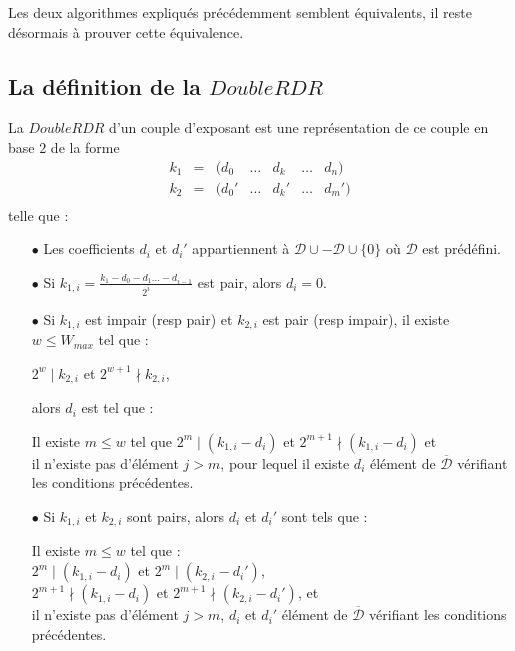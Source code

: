 \documentclass[12pt, a4paper]{memoir}
\newcommand{\dbarre}{\overline{\mathcal{D}}}
\begin{document}
  Les deux algorithmes expliqués précédemment semblent équivalents, il reste désormais à prouver cette équivalence.

  \subsection{La définition de la $DoubleRDR$}
  
  \begin{Definition}
   La $DoubleRDR$ d'un couple d'exposant est une représentation de ce couple en base $2$ de la forme
$$\begin{array}{cccccccccc}
  k_1 & = & (d_0 & \ldots & d_k  & \ldots & d_n) \\
  k_2 & = & (d_0' & \ldots & d_k' & \ldots & d_m') \\
 \end{array}$$
 telle que :
   \begin{itemize}
    \item [$\bullet$] Les coefficients $d_i$ et $d_i'$ appartiennent à $\mathcal{D} \cup -\mathcal{D} \cup \{0\}$
    où $\mathcal{D}$ est prédéfini.
    \item [$\bullet$] Si $k_{1,i} = \frac{k_1-d_0-d_1 \ldots -d_{i-1}}{2^i}$ est pair, alors $d_i = 0$.
    \item [$\bullet$] Si $k_{1,i}$ est impair (resp pair) et $k_{2,i}$ est pair (resp impair), il existe 
    $w \leq W_{max}$ tel que :
   \begin{center}
    $2^{w} \mid k_{2,i}$ et $2^{w+1} \nmid k_{2,i}$,
   \end{center}
   alors $d_i$ est tel que :
   \begin{center}
   Il existe $m \leq w$ tel que $2^{m} \mid (k_{1,i}-d_i)$ et $2^{m+1} \nmid (k_{1,i}-d_i)$ et \\
   il n'existe pas d'élément $j>m$, pour lequel il existe $d_i$ élément de $\dbarre$ vérifiant les conditions précédentes.
   \end{center}
   \item [$\bullet$] Si $k_{1,i}$ et $k_{2,i}$ sont pairs, alors $d_i$ et $d_i'$ sont tels que :
   \begin{center}
   Il existe $m \leq w$ tel que : \\
   $2^{m} \mid (k_{1,i}-d_i)$ et $2^{m} \mid (k_{2,i}-d_i')$, \\
   $2^{m+1} \nmid (k_{1,i}-d_i)$ et $2^{m+1} \nmid (k_{2,i}-d_i')$, et \\
   il n'existe pas d'élément $j>m$, $d_i$ et $d_i'$ élément de $\dbarre$ vérifiant les conditions précédentes.
   \end{center}
   \end{itemize}
  \end{Definition}
  
\end{document}
